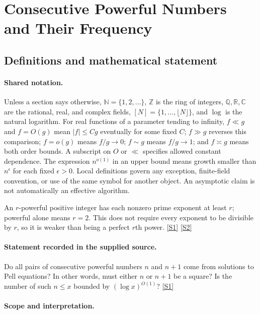 \documentclass[11pt,a4paper]{article}
\newcommand{\N}{\mathbb{N}}
\newcommand{\Z}{\mathbb{Z}}
\newcommand{\Q}{\mathbb{Q}}
\newcommand{\R}{\mathbb{R}}
\newcommand{\C}{\mathbb{C}}
\newcommand{\sref}[2]{\hyperlink{source:#1:#2}{[S#2]}}
\begin{document}
\section{Consecutive Powerful Numbers and Their Frequency}\label{statement}


\subsection{Definitions and mathematical statement}

\paragraph{Shared notation.}Unless a section says otherwise, $\N=\{1,2,\ldots\}$,
$\Z$ is the ring of integers, $\Q,\R,\C$ are the rational, real, and complex
fields, $[N]=\{1,\ldots,\lfloor N\rfloor\}$, and $\log$ is the natural
logarithm. For real functions of a parameter tending to infinity,
$f\ll g$ and $f=O(g)$ mean $|f|\leq Cg$ eventually for some fixed $C$;
$f\gg g$ reverses this comparison; $f=o(g)$ means $f/g\to0$;
$f\sim g$ means $f/g\to1$; and $f\asymp g$ means both order bounds.
A subscript on $O$ or $\ll$ specifies allowed constant dependence.
The expression $n^{o(1)}$ in an upper bound means growth smaller than
$n^\epsilon$ for each fixed $\epsilon>0$. Local definitions govern any
exception, finite-field convention, or use of the same symbol for another
object. An asymptotic claim is not automatically an effective algorithm.



An $r$-powerful positive integer has each nonzero prime exponent at least $r$; powerful alone means $r=2$. This does not require every exponent to be divisible by $r$, so it is weaker than being a perfect $r$th power. \sref{statement}{1} \sref{statement}{2}

\paragraph{Statement recorded in the supplied source.}
Do all pairs of consecutive powerful numbers $n$ and $n+1$ come from solutions to Pell equations? In other words, must either $n$ or $n+1$ be a square?
Is the number of such $n\leq x$ bounded by $(\log x)^{O(1)}$? \sref{statement}{1}

\paragraph{Scope and interpretation.}
\end{document}
